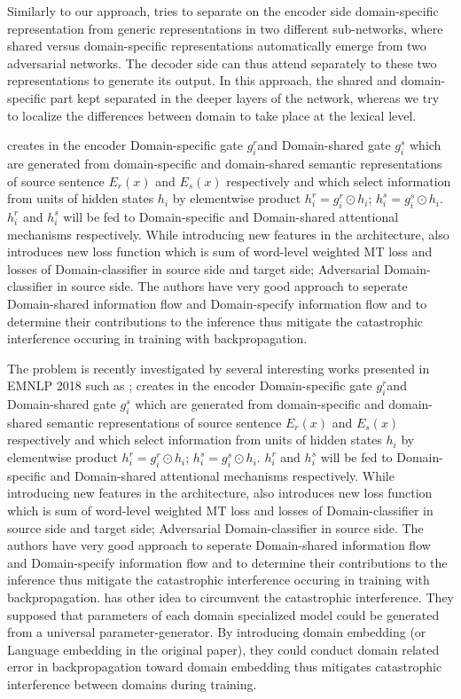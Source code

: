 \documentclass[11pt,a4paper]{article}
\begin{document}
Similarly to our approach, \cite{Zeng18multidomain} tries to separate on the encoder side domain-specific representation from generic representations in two different sub-networks, where shared versus domain-specific representations automatically emerge from two adversarial networks. The decoder side can thus attend separately to these two representations to generate its output. In this approach, the shared and domain-specific part kept separated in the deeper layers of the network, whereas we try to localize the differences between domain to take place at the lexical level.

creates in the encoder Domain-specific gate $g^r_i$and Domain-shared gate $g^s_i$ which are generated from domain-specific and domain-shared semantic representations of source sentence $E_r(x)$ and $E_s(x)$ respectively and which select information from units of hidden states $h_i$ by elementwise product $h^r_i = g^r_i \odot h_i$; $h^s_i = g^s_i \odot h_i$. $h^r_i$ and $h^s_i$ will be fed to Domain-specific and Domain-shared attentional mechanisms respectively. While introducing new features in the architecture, \cite{Zeng18multidomain} also introduces new loss function which is sum of word-level weighted MT loss and losses of Domain-classifier in source side and target side; Adversarial Domain-classifier in source side. The authors have very good approach to seperate Domain-shared information flow and Domain-specify information flow and to determine their contributions to the inference thus mitigate the catastrophic interference occuring in training with backpropagation.

The problem is recently investigated by several interesting works presented in EMNLP 2018 such as \cite{Platanios18contextual}; \cite{Zeng18multidomain} creates in the encoder Domain-specific gate $g^r_i$and Domain-shared gate $g^s_i$ which are generated from domain-specific and domain-shared semantic representations of source sentence $E_r(x)$ and $E_s(x)$ respectively and which select information from units of hidden states $h_i$ by elementwise product $h^r_i = g^r_i \odot h_i$; $h^s_i = g^s_i \odot h_i$. $h^r_i$ and $h^s_i$ will be fed to Domain-specific and Domain-shared attentional mechanisms respectively. While introducing new features in the architecture, \cite{Zeng18multidomain} also introduces new loss function which is sum of word-level weighted MT loss and losses of Domain-classifier in source side and target side; Adversarial Domain-classifier in source side. The authors have very good approach to seperate Domain-shared information flow and Domain-specify information flow and to determine their contributions to the inference thus mitigate the catastrophic interference occuring in training with backpropagation. \cite{Platanios18contextual} has other idea to circumvent the catastrophic interference. They supposed that parameters of each domain specialized model could be generated from a universal parameter-generator. By introducing domain embedding (or Language embedding in the original paper), they could conduct domain related error in backpropagation toward domain embedding thus mitigates catastrophic interference between domains during training.
\end{document}
